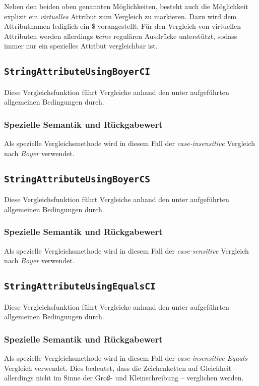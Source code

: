 Neben den beiden oben genannten Möglichkeiten, besteht auch die Möglichkeit explizit ein \emph{virtuelles} Attribut zum Vergleich zu markieren. Dazu wird dem Attributnamen lediglich ein $\$$ vorangestellt. Für den Vergleich von virtuellen Attributen werden allerdings \emph{keine} regulären Ausdrücke unterstützt, sodass immer nur ein spezielles Attribut vergleichbar ist.

\vskip15pt
%
%
\subsection{\texttt{StringAttributeUsingBoyerCI}}
Diese Vergleichsfunktion führt Vergleiche anhand den unter  aufgeführten allgemeinen Bedingungen durch.

\subsubsection*{Spezielle Semantik und Rückgabewert}
Als spezielle Vergleichsmethode wird in diesem Fall der \emph{case-insensitive} Vergleich nach \emph{Boyer} verwendet.


%
%
\subsection{\texttt{StringAttributeUsingBoyerCS}}
Diese Vergleichsfunktion führt Vergleiche anhand den unter  aufgeführten allgemeinen Bedingungen durch.

\subsubsection*{Spezielle Semantik und Rückgabewert}
Als spezielle Vergleichsmethode wird in diesem Fall der \emph{case-sensitive} Vergleich nach \emph{Boyer} verwendet.


%
%
\subsection{\texttt{StringAttributeUsingEqualsCI}}
Diese Vergleichsfunktion führt Vergleiche anhand den unter  aufgeführten allgemeinen Bedingungen durch.

\subsubsection*{Spezielle Semantik und Rückgabewert}
Als spezielle Vergleichsmethode wird in diesem Fall der \emph{case-insensitive Equals}-Vergleich verwendet. Dies bedeutet, dass die Zeichenketten auf Gleichheit -- allerdings nicht im Sinne der Groß- und Kleinschreibung -- verglichen werden.


